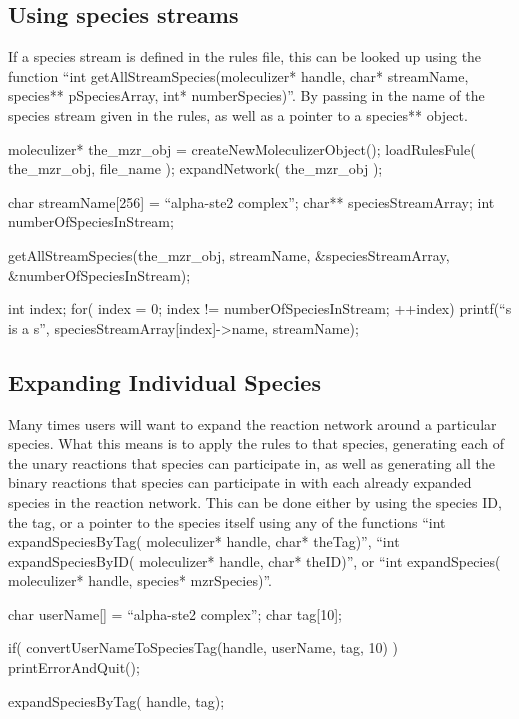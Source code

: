 \subsection{Using species streams}
If a species stream is defined in the rules file, this can be looked
up using the function ``int getAllStreamSpecies(moleculizer* handle,
char* streamName, species** pSpeciesArray, int* numberSpecies)''. By
passing in the name of the species stream given in the rules, as well
as a pointer to a species** object.  

\begin{ExampleC}
moleculizer* the_mzr_obj = createNewMoleculizerObject();
loadRulesFule( the_mzr_obj, file_name );
expandNetwork( the_mzr_obj );

char streamName[256] = ``alpha-ste2 complex'';
char** speciesStreamArray;
int numberOfSpeciesInStream;

getAllStreamSpecies(the_mzr_obj, streamName, &speciesStreamArray,
&numberOfSpeciesInStream);

int index;
for( index = 0; index != numberOfSpeciesInStream; ++index)
{
  printf(``s is a s'', speciesStreamArray[index]->name, streamName);
}

\end{ExampleC}

\subsection{Expanding Individual Species}
Many times users will want to expand the reaction network around a
particular species.  What this means is to apply the rules to that
species, generating each of the unary reactions that species can
participate in, as well as generating all the binary reactions that
species can participate in with each already expanded species in the
reaction network.  This can be done either by using the species ID,
the tag, or a pointer to the species itself using any of the functions
``int expandSpeciesByTag( moleculizer* handle, char* theTag)'', ``int
expandSpeciesByID( moleculizer* handle, char* theID)'', or ``int
expandSpecies( moleculizer* handle, species* mzrSpecies)''.

\begin{ExampleC}

char userName[] = ``alpha-ste2 complex'';
char tag[10];

if( convertUserNameToSpeciesTag(handle, userName, tag, 10) ) printErrorAndQuit();

expandSpeciesByTag( handle, tag);

\end{ExampleC}

